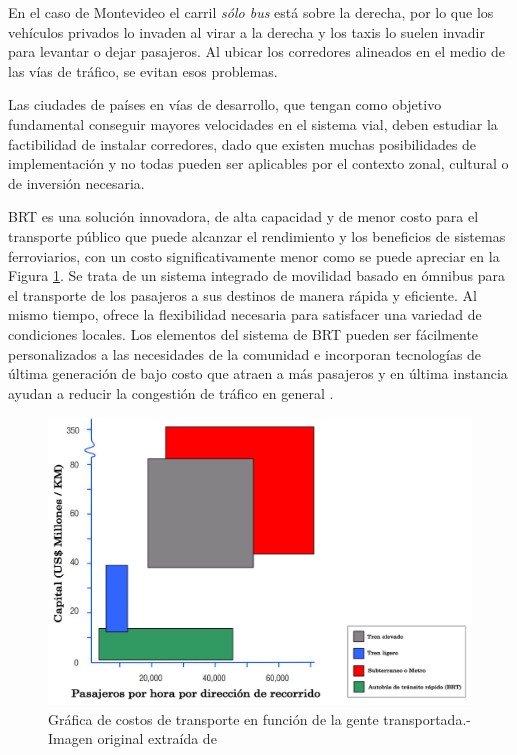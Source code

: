 En el caso de Montevideo el carril \emph{sólo bus} está sobre la derecha, por lo que los vehículos privados lo invaden al virar a la derecha y los taxis lo suelen invadir para levantar o dejar pasajeros. Al ubicar los corredores alineados en el medio de las vías de tráfico, se evitan esos problemas.  

Las ciudades de países en vías de desarrollo, que tengan como objetivo fundamental conseguir mayores velocidades en el sistema vial, deben estudiar la factibilidad de instalar corredores, dado que existen muchas posibilidades de implementación y no todas pueden ser aplicables por el contexto zonal, cultural o de inversión necesaria.


BRT es una solución innovadora, de alta capacidad y de menor costo para el transporte público que puede alcanzar el rendimiento y los beneficios de sistemas ferroviarios, con un costo significativamente menor como se puede apreciar en la Figura \ref{fig:Grafica de costos de otros medios de transporte}. Se trata de un sistema integrado de movilidad basado en ómnibus para el transporte de los pasajeros a sus destinos de manera rápida y eficiente. Al mismo tiempo, ofrece la flexibilidad necesaria para satisfacer una variedad de condiciones locales. Los elementos del sistema de BRT pueden ser fácilmente personalizados a las necesidades de la comunidad e incorporan tecnologías de última generación de bajo costo que atraen a más pasajeros y en última instancia ayudan a reducir la congestión de tráfico en general \citep{ITDP}.

\begin{figure}[ht]
	\centering
	\includegraphics[width=0.9\linewidth]{Figures/costo_transporte}
	\caption[Gráfica de costos de transporte en función de la gente transportada.]{Gráfica de costos de transporte en función de la gente transportada.- Imagen original extraída de \citet{ITDP}		
	}
	\label{fig:Grafica de costos de otros medios de transporte}
\end{figure}

